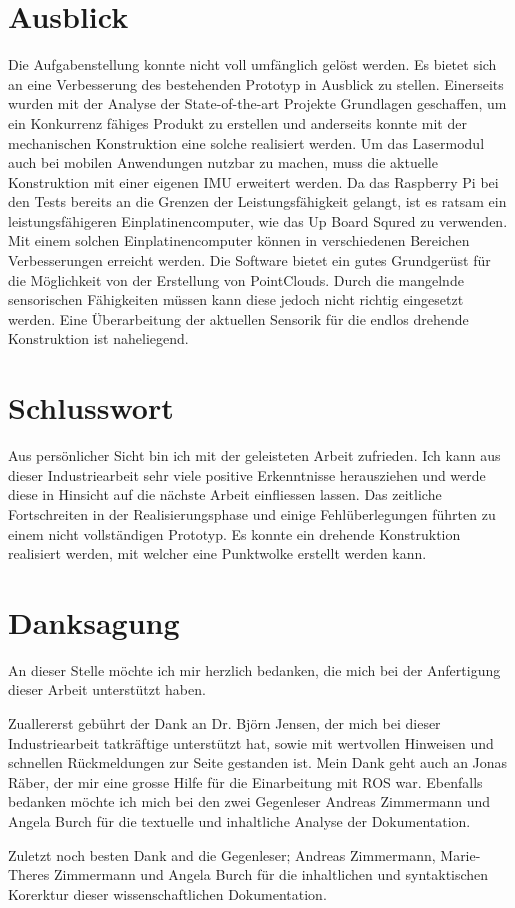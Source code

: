 \section{Ausblick}
\label{sec: Ausblick}
Die Aufgabenstellung konnte nicht voll umfänglich gelöst werden. Es bietet sich an eine Verbesserung des bestehenden Prototyp in Ausblick zu stellen. Einerseits wurden mit der Analyse der State-of-the-art Projekte Grundlagen geschaffen, um ein Konkurrenz fähiges Produkt zu erstellen und anderseits konnte mit der mechanischen Konstruktion eine solche realisiert werden. Um das Lasermodul auch bei mobilen Anwendungen nutzbar zu machen, muss die aktuelle Konstruktion mit einer eigenen IMU erweitert werden. Da das Raspberry Pi bei den Tests bereits an die Grenzen der Leistungsfähigkeit gelangt, ist es ratsam ein leistungsfähigeren Einplatinencomputer, wie das Up Board Squred zu verwenden. Mit einem solchen Einplatinencomputer können in verschiedenen Bereichen Verbesserungen erreicht werden. Die Software bietet ein gutes Grundgerüst für die Möglichkeit von der Erstellung von PointClouds. Durch die mangelnde sensorischen Fähigkeiten müssen kann diese jedoch nicht richtig eingesetzt werden. Eine Überarbeitung der aktuellen Sensorik für die endlos drehende Konstruktion ist naheliegend.

\section{Schlusswort}
Aus persönlicher Sicht bin ich mit der geleisteten Arbeit zufrieden. Ich kann aus dieser Industriearbeit sehr viele positive Erkenntnisse herausziehen und werde diese in Hinsicht auf die nächste Arbeit einfliessen lassen. Das zeitliche Fortschreiten in der Realisierungsphase und einige Fehlüberlegungen führten zu einem nicht vollständigen Prototyp. Es konnte ein drehende Konstruktion realisiert werden, mit welcher eine Punktwolke erstellt werden kann.  

\section{Danksagung}
An dieser Stelle möchte ich mir herzlich bedanken, die mich bei der Anfertigung dieser Arbeit unterstützt haben.

Zuallererst gebührt der Dank an Dr. Björn Jensen, der mich bei dieser Industriearbeit tatkräftige unterstützt hat, sowie mit wertvollen Hinweisen und schnellen Rückmeldungen zur Seite gestanden ist.
Mein Dank geht auch an Jonas Räber, der mir eine grosse Hilfe für die Einarbeitung mit \ac{ROS} war. Ebenfalls bedanken möchte ich mich bei den zwei Gegenleser Andreas Zimmermann und Angela Burch für die textuelle und inhaltliche Analyse der Dokumentation.

Zuletzt noch besten Dank and die Gegenleser; Andreas Zimmermann, Marie-Theres Zimmermann und Angela Burch für die inhaltlichen und syntaktischen Korerktur dieser wissenschaftlichen Dokumentation.

